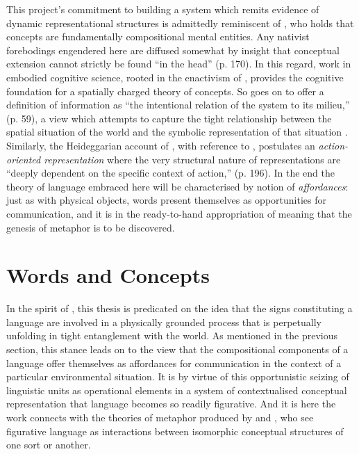 This project's commitment to building a system which remits evidence of dynamic representational structures is admittedly reminiscent of \cite{Fodor}, who holds that concepts are fundamentally compositional mental entities.  Any nativist forebodings engendered here are diffused somewhat by  insight that conceptual extension cannot strictly be found ``in the head'' (p. 170).  In this regard, work in embodied cognitive science, rooted in the enactivism of \cite{Varela}, provides the cognitive foundation for a spatially charged theory of concepts.  So \cite{Thompson} goes on to offer a definition of information as ``the intentional relation of the system to its milieu,'' (p. 59), a view which attempts to capture the tight relationship between the spatial situation of the world and the symbolic representation of that situation \citep[][is another notable proponent of this approach]{Pattee}.  Similarly, the Heideggarian account of \cite{Wheeler}, with reference to \cite{Clark}, postulates an \emph{action-oriented representation} where the very structural nature of representations are ``deeply dependent on the specific context of action,'' (p. 196).  In the end the theory of language embraced here will be characterised by  notion of \emph{affordances}: just as with physical objects, words present themselves as opportunities for communication, and it is in the ready-to-hand appropriation of meaning that the genesis of metaphor is to be discovered.

\section{Words and Concepts}
In the spirit of \cite{Peirce}, this thesis is predicated on the idea that the signs constituting a language are involved in a physically grounded process that is perpetually unfolding in tight entanglement with the world.  As mentioned in the previous section, this stance leads on to the view that the compositional components of a language offer themselves as affordances for communication in the context of a particular environmental situation.  It is by virtue of this opportunistic seizing of linguistic units as operational elements in a system of contextualised conceptual representation that language becomes so readily figurative.  And it is here the work connects with the theories of metaphor produced by \cite{Black} and \cite{Lakoff}, who see figurative language as interactions between isomorphic conceptual structures of one sort or another.

